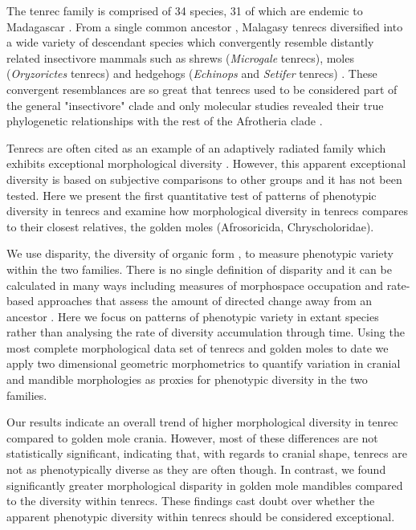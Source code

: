 \documentclass[12pt,a4paper]{article}
\begin{document}
The tenrec family is comprised of 34 species, 31 of which are endemic to Madagascar \citep{Olson2013}. From a single common ancestor \citep{Asher2006}, Malagasy tenrecs diversified into a wide variety of descendant species which convergently resemble distantly related insectivore mammals such as shrews (\textit{Microgale} tenrecs), moles (\textit{Oryzorictes} tenrecs) and hedgehogs (\textit{Echinops} and \textit{Setifer} tenrecs) \citep{Eisenberg1969}. These convergent resemblances are so great that tenrecs used to be considered part of the general "insectivore" clade and only molecular studies revealed their true phylogenetic relationships with the rest of the Afrotheria clade \citep{Stanhope1998}.  

Tenrecs are often cited as an example of an adaptively radiated family which exhibits exceptional morphological diversity \citep{Soarimalala2011, Olson2003, Eisenberg1969}. However, this apparent exceptional diversity is based on subjective comparisons to other groups and it has not been tested. Here we present the first quantitative test of patterns of phenotypic diversity in tenrecs and examine how morphological diversity in tenrecs compares to their closest relatives, the golden moles (Afrosoricida, Chryscholoridae). 

We use disparity, the diversity of organic form \citep{Foote1997, Wills1994, Erwin2007}, to measure phenotypic variety within the two families. There is no single definition of disparity and it can be calculated in many ways including measures of morphospace occupation \citep[e.g.][]{Goswami2011, Brusatte2008} and rate-based approaches that assess the amount of directed change away from an ancestor \citep{OMeara2006, Price2013}. Here we focus on patterns of phenotypic variety in extant species rather than analysing the rate of diversity accumulation through time. 
Using the most complete morphological data set of tenrecs and golden moles to date we apply two dimensional geometric morphometrics \citep{Rohlf1993, Adams2013} to quantify variation in cranial and mandible morphologies as proxies for phenotypic diversity in the two families. 

Our results indicate an overall trend of higher morphological diversity in tenrec compared to golden mole crania. However, most of these differences are not statistically significant, indicating that, with regards to cranial shape, tenrecs are not as phenotypically diverse as they are often though. In contrast, we found significantly greater morphological disparity in golden mole mandibles compared to the diversity within tenrecs.
These findings cast doubt over whether the apparent phenotypic diversity within tenrecs should be considered exceptional. 
\end{document}
